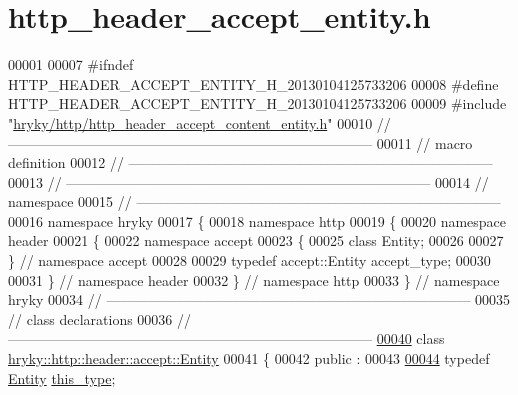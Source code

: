 \hypertarget{http__header__accept__entity_8h_source}{\section{http\-\_\-header\-\_\-accept\-\_\-entity.\-h}
}

\begin{DoxyCode}
00001 
00007 \textcolor{preprocessor}{#ifndef HTTP\_HEADER\_ACCEPT\_ENTITY\_H\_20130104125733206}
00008 \textcolor{preprocessor}{}\textcolor{preprocessor}{#define HTTP\_HEADER\_ACCEPT\_ENTITY\_H\_20130104125733206}
00009 \textcolor{preprocessor}{}\textcolor{preprocessor}{#include "\hyperlink{http__header__accept__content__entity_8h}{hryky/http/http_header_accept_content_entity.h}"}
00010 \textcolor{comment}{//
      ------------------------------------------------------------------------------}
00011 \textcolor{comment}{// macro definition}
00012 \textcolor{comment}{//
      ------------------------------------------------------------------------------}
00013 \textcolor{comment}{//
      ------------------------------------------------------------------------------}
00014 \textcolor{comment}{// namespace}
00015 \textcolor{comment}{//
      ------------------------------------------------------------------------------}
00016 \textcolor{keyword}{namespace }hryky
00017 \{
00018 \textcolor{keyword}{namespace }http
00019 \{
00020 \textcolor{keyword}{namespace }header
00021 \{
00022 \textcolor{keyword}{namespace }accept
00023 \{
00025     \textcolor{keyword}{class }Entity;
00026 
00027 \} \textcolor{comment}{// namespace accept}
00028 
00029 \textcolor{keyword}{typedef} accept::Entity accept\_type;
00030 
00031 \} \textcolor{comment}{// namespace header}
00032 \} \textcolor{comment}{// namespace http}
00033 \} \textcolor{comment}{// namespace hryky}
00034 \textcolor{comment}{//
      ------------------------------------------------------------------------------}
00035 \textcolor{comment}{// class declarations}
00036 \textcolor{comment}{//
      ------------------------------------------------------------------------------}
\hypertarget{http__header__accept__entity_8h_source_l00040}{}\hyperlink{classhryky_1_1http_1_1header_1_1accept_1_1_entity}{00040} \textcolor{comment}{}\textcolor{keyword}{class }\hyperlink{classhryky_1_1http_1_1header_1_1accept_1_1_entity}{hryky::http::header::accept::Entity}
00041 \{
00042 \textcolor{keyword}{public} :
00043 
\hypertarget{http__header__accept__entity_8h_source_l00044}{}\hyperlink{classhryky_1_1http_1_1header_1_1accept_1_1_entity_a09779fe531e8017b8d88ef779e186488}{00044}     \textcolor{keyword}{typedef} \hyperlink{classhryky_1_1http_1_1header_1_1accept_1_1_entity}{Entity} \hyperlink{classhryky_1_1http_1_1header_1_1accept_1_1_entity_a09779fe531e8017b8d88ef779e186488}{this_type};

\end{DoxyCode}
